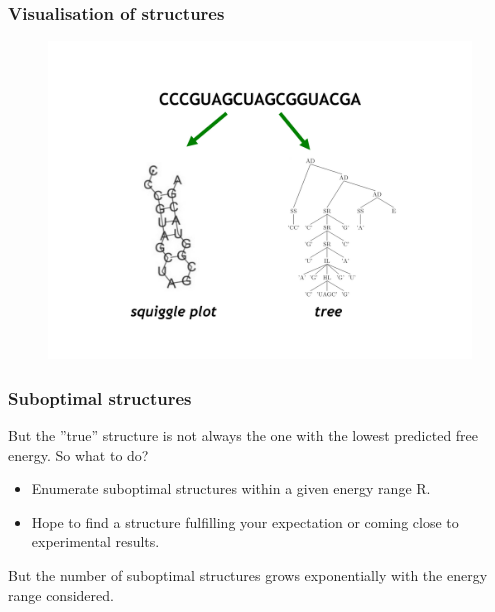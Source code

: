 \documentclass[ignorenonframetext,10pt]{beamer}
\begin{document}


\begin{frame}
\frametitle{Visualisation of structures}  
\begin{figure}
  \includegraphics[scale=0.4]{images/visualisation_structures.pdf} 
\end{figure}
\end{frame}

\begin{frame}
\frametitle{Suboptimal structures}
    But the ''true'' structure is not always the one with the lowest
    predicted free energy.
    So what to do?
    \begin{itemize} 
    \item Enumerate suboptimal structures within a given energy range R.
    \item Hope to find a structure fulfilling your expectation or coming close
    to experimental results.
    \end{itemize}
    But the number of suboptimal structures grows exponentially with the energy
    range considered.
\end{frame}
\end{document}
